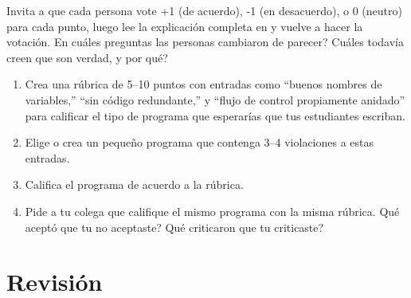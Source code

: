 Invita a que cada persona vote +1 (de acuerdo), -1 (en desacuerdo), o 0 (neutro) para cada punto,
luego lee la explicación completa en
y vuelve a hacer la votación.
En cuáles preguntas las personas cambiaron de parecer?
Cuáles todavía creen que son verdad, y por qué?


\begin{enumerate}

\item
  Crea una rúbrica de 5--10 puntos
  con entradas como ``buenos nombres de variables,'' ``sin código redundante,'' y ``flujo de control propiamente anidado''
  para calificar el tipo de programa que esperarías que tus estudiantes escriban.

\item
  Elige o crea un pequeño programa que contenga 3--4 violaciones a estas entradas.

\item
  Califica el programa de acuerdo a la rúbrica.

\item
  Pide a tu colega que califique el mismo programa con la misma rúbrica.
  Qué aceptó que tu no aceptaste?
  Qué criticaron que tu criticaste?

\end{enumerate}

\section*{Revisión}

